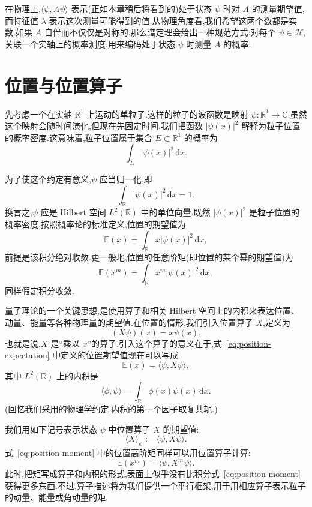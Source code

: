 在物理上,\(\langle\psi,A\psi\rangle\) 表示(正如本章稍后将看到的)处于状态 \(\psi\) 时对 \(A\) 的测量期望值,而特征值 \(\lambda\) 表示这次测量可能得到的值.从物理角度看,我们希望这两个数都是实数.如果 \(A\) 自伴而不仅仅是对称的,那么谱定理会给出一种规范方式:对每个 \(\psi\in\mathcal{H}\),关联一个实轴上的概率测度,用来编码处于状态 \(\psi\) 时测量 \(A\) 的概率.

\section{位置与位置算子}\label{sec:position-operator}

先考虑一个在实轴 \(\mathbb{R}^{1}\) 上运动的单粒子.这样的粒子的波函数是映射 \(\psi:\mathbb{R}^{1}\to\mathbb{C}\).虽然这个映射会随时间演化,但现在先固定时间.我们把函数 \(|\psi(x)|^{2}\) 解释为粒子位置的概率密度.这意味着,粒子位置属于集合 \(E\subset\mathbb{R}^{1}\) 的概率为
\[
\int_{E}|\psi(x)|^{2}\,\mathrm{d}x.
\]

为了使这个约定有意义,\(\psi\) 应当归一化,即
\begin{equation}
\int_{\mathbb{R}}|\psi(x)|^{2}\,\mathrm{d}x=1.
\label{eq:wavefunction-normalization}
\end{equation}
换言之,\(\psi\) 应是 Hilbert 空间 \(L^{2}(\mathbb{R})\) 中的单位向量.既然 \(|\psi(x)|^{2}\) 是粒子位置的概率密度,按照概率论的标准定义,位置的期望值为
\begin{equation}
\mathbb{E}(x)=\int_{\mathbb{R}}x|\psi(x)|^{2}\,\mathrm{d}x,
\label{eq:position-expectation}
\end{equation}
前提是该积分绝对收敛.更一般地,位置的任意阶矩(即位置的某个幂的期望值)为
\begin{equation}
\mathbb{E}(x^{m})=\int_{\mathbb{R}}x^{m}|\psi(x)|^{2}\,\mathrm{d}x,
\label{eq:position-moment}
\end{equation}
同样假定积分收敛.

量子理论的一个关键思想,是使用算子和相关 Hilbert 空间上的内积来表达位置、动量、能量等各种物理量的期望值.在位置的情形,我们引入位置算子 \(X\),定义为
\[
(X\psi)(x)=x\psi(x).
\]
也就是说,\(X\) 是“乘以 \(x\)”的算子.引入这个算子的意义在于,式~\eqref{eq:position-expectation} 中定义的位置期望值现在可以写成
\[
\mathbb{E}(x)=\langle\psi,X\psi\rangle,
\]
其中 \(L^{2}(\mathbb{R})\) 上的内积是
\[
\langle\phi,\psi\rangle=\int_{\mathbb{R}}\overline{\phi(x)}\psi(x)\,\mathrm{d}x.
\]
(回忆我们采用的物理学约定:内积的第一个因子取复共轭.)

我们用如下记号表示状态 \(\psi\) 中位置算子 \(X\) 的期望值:
\[
\langle X\rangle_{\psi}:=\langle\psi,X\psi\rangle.
\]
式~\eqref{eq:position-moment} 中的位置高阶矩同样可以用位置算子计算:
\[
\mathbb{E}(x^{m})=\langle\psi,X^{m}\psi\rangle.
\]
此时,把矩写成算子和内积的形式,表面上似乎没有比积分式~\eqref{eq:position-moment} 获得更多东西.不过,算子描述将为我们提供一个平行框架,用于用相应算子表示粒子的动量、能量或角动量的矩.

